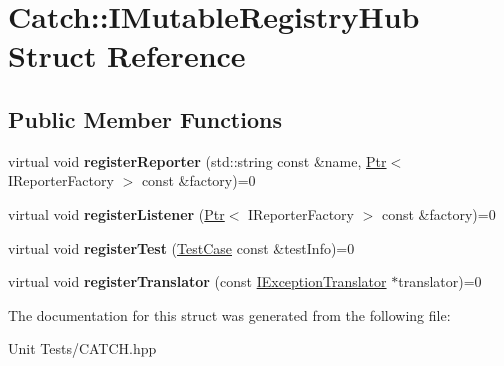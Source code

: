 \hypertarget{structCatch_1_1IMutableRegistryHub}{}\section{Catch\+:\+:I\+Mutable\+Registry\+Hub Struct Reference}
\label{structCatch_1_1IMutableRegistryHub}
\subsection*{Public Member Functions}
\begin{DoxyCompactItemize}
\item 
virtual void {\bfseries register\+Reporter} (std\+::string const \&name, \hyperlink{classCatch_1_1Ptr}{Ptr}$<$ I\+Reporter\+Factory $>$ const \&factory)=0\hypertarget{structCatch_1_1IMutableRegistryHub_aab72d0aa1fa14627f1a6a4c893ae0a12}{}\label{structCatch_1_1IMutableRegistryHub_aab72d0aa1fa14627f1a6a4c893ae0a12}

\item 
virtual void {\bfseries register\+Listener} (\hyperlink{classCatch_1_1Ptr}{Ptr}$<$ I\+Reporter\+Factory $>$ const \&factory)=0\hypertarget{structCatch_1_1IMutableRegistryHub_ae06fcb90ba3f2b389d450cd81e229276}{}\label{structCatch_1_1IMutableRegistryHub_ae06fcb90ba3f2b389d450cd81e229276}

\item 
virtual void {\bfseries register\+Test} (\hyperlink{classCatch_1_1TestCase}{Test\+Case} const \&test\+Info)=0\hypertarget{structCatch_1_1IMutableRegistryHub_a11b85c6744d88c9f83fe16ad4a8dd451}{}\label{structCatch_1_1IMutableRegistryHub_a11b85c6744d88c9f83fe16ad4a8dd451}

\item 
virtual void {\bfseries register\+Translator} (const \hyperlink{structCatch_1_1IExceptionTranslator}{I\+Exception\+Translator} $\ast$translator)=0\hypertarget{structCatch_1_1IMutableRegistryHub_ae6825365102693cf7707db022a2c2b49}{}\label{structCatch_1_1IMutableRegistryHub_ae6825365102693cf7707db022a2c2b49}

\end{DoxyCompactItemize}


The documentation for this struct was generated from the following file\+:\begin{DoxyCompactItemize}
\item 
Unit Tests/C\+A\+T\+C\+H.\+hpp\end{DoxyCompactItemize}
